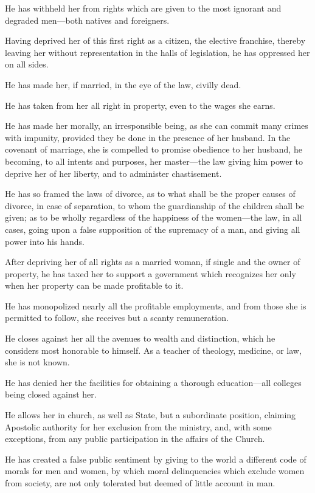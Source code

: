 \documentclass{article}
\begin{document}
He has withheld her from rights which are given to the most ignorant and
degraded men—both natives and foreigners.

Having deprived her of this first right as a citizen, the elective franchise,
thereby leaving her without representation in the halls of legislation, he has
oppressed her on all sides.

He has made her, if married, in the eye of the law, civilly dead.

He has taken from her all right in property, even to the wages she earns.

He has made her morally, an irresponsible being, as she can commit many crimes
with impunity, provided they be done in the presence of her husband. In the
covenant of marriage, she is compelled to promise obedience to her husband, he
becoming, to all intents and purposes, her master—the law giving him power to
deprive her of her liberty, and to administer chastisement.

He has so framed the laws of divorce, as to what shall be the proper causes of
divorce, in case of separation, to whom the guardianship of the children shall
be given; as to be wholly regardless of the happiness of the women—the law, in
all cases, going upon a false supposition of the supremacy of a man, and giving
all power into his hands.

After depriving her of all rights as a married woman, if single and the owner
of property, he has taxed her to support a government which recognizes her only
when her property can be made profitable to it.

He has monopolized nearly all the profitable employments, and from those she is
permitted to follow, she receives but a scanty remuneration.

He closes against her all the avenues to wealth and distinction, which he
considers most honorable to himself. As a teacher of theology, medicine, or
law, she is not known.

He has denied her the facilities for obtaining a thorough education—all
colleges being closed against her.

He allows her in church, as well as State, but a subordinate position, claiming
Apostolic authority for her exclusion from the ministry, and, with some
exceptions, from any public participation in the affairs of the Church.

He has created a false public sentiment by giving to the world a different code
of morals for men and women, by which moral delinquencies which exclude women
from society, are not only tolerated but deemed of little account in man.
\end{document}
